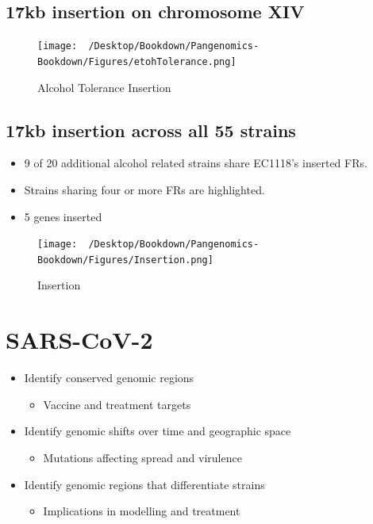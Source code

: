 \documentclass[
]{book}
\providecommand{\tightlist}{%
  \setlength{\itemsep}{0pt}\setlength{\parskip}{0pt}}
\begin{document}
\hypertarget{kb-insertion-on-chromosome-xiv}{%
\subsection{17kb insertion on chromosome XIV}\label{kb-insertion-on-chromosome-xiv}}

\begin{figure}
\centering
\texttt{[image: ~/Desktop/Bookdown/Pangenomics-Bookdown/Figures/etohTolerance.png]}
\caption{Alcohol Tolerance Insertion}
\end{figure}

\hypertarget{kb-insertion-across-all-55-strains}{%
\subsection{17kb insertion across all 55 strains}\label{kb-insertion-across-all-55-strains}}

\begin{itemize}
\tightlist
\item
  9 of 20 additional alcohol related strains share EC1118's inserted FRs.
\item
  Strains sharing four or more FRs are highlighted.
\item
  5 genes inserted
\end{itemize}

\begin{figure}
\centering
\texttt{[image: ~/Desktop/Bookdown/Pangenomics-Bookdown/Figures/Insertion.png]}
\caption{Insertion}
\end{figure}

\hypertarget{sars-cov-2}{%
\section{SARS-CoV-2}\label{sars-cov-2}}

\begin{itemize}
\tightlist
\item
  Identify conserved genomic regions

  \begin{itemize}
  \tightlist
  \item
    Vaccine and treatment targets
  \end{itemize}
\item
  Identify genomic shifts over time and geographic space

  \begin{itemize}
  \tightlist
  \item
    Mutations affecting spread and virulence
  \end{itemize}
\item
  Identify genomic regions that differentiate strains

  \begin{itemize}
  \tightlist
  \item
    Implications in modelling and treatment
  \end{itemize}
\end{itemize}
\end{document}
